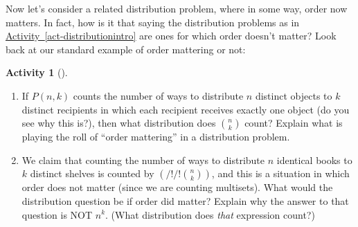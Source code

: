 \documentclass[10pt,]{book}
\theoremstyle{plain}
\theoremstyle{definition}
\theoremstyle{definition}
\theoremstyle{definition}
\newtheorem{activity}[project]{Activity}
\theoremstyle{definition}
\numberwithin{equation}{chapter}
\newcommand{\mchoose}[2]{\left(/!/!\binom{#1}{#2}\!\!\right)}
\begin{document}
\hypertarget{p-727}{}%
Now let's consider a related distribution problem, where in some way, order now matters.  In fact, how is it that saying the distribution problems as in \hyperref[act-distributionintro]{Activity~\ref{act-distributionintro}} are ones for which order doesn't matter?  Look back at our standard example of order mattering or not:%
\begin{activity}[]\label{activity-66}
\leavevmode%
\begin{enumerate}[font=\bfseries,label=(\alph*),ref=\alph*]
\item\label{task-90} \hypertarget{p-728}{}%
If \(P(n,k)\) counts the number of ways to distribute \(n\) distinct objects to \(k\) distinct recipients in which each recipient receives exactly one object (do you see why this is?), then what distribution does \(\binom{n}{k}\) count?  Explain what is playing the roll of ``order mattering'' in a distribution problem.%
\item\label{task-91} \hypertarget{p-729}{}%
We claim that counting the number of ways to distribute \(n\) identical books to \(k\) distinct shelves is counted by \(\mchoose{n}{k}\), and this is a situation in which order does not matter (since we are counting multisets).  What would the distribution question be if order did matter?  Explain why the answer to that question is NOT \(n^k\). (What distribution does \emph{that} expression count?)%
\end{enumerate}
\end{activity}
\end{document}
